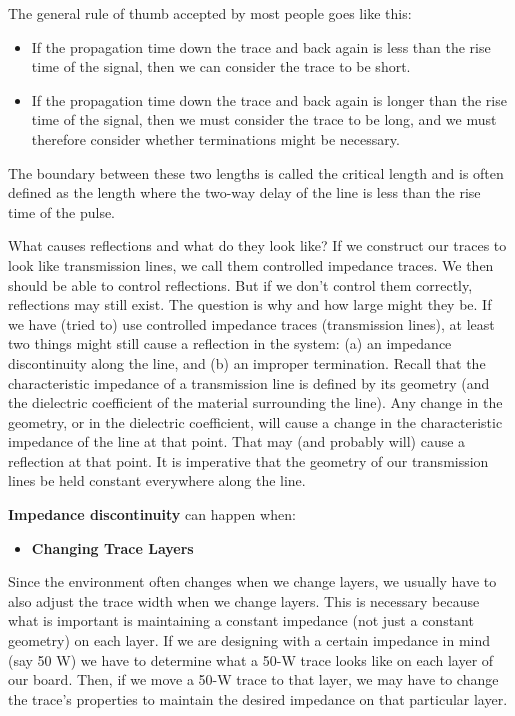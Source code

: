 \documentclass[final]{cubedoc}
\begin{document}
	The general rule of thumb accepted by most people goes like this:
	
	\begin{itemize}
		\item If the propagation time down the trace and back again is less than the rise time of the signal, then we can consider the trace to be short.
		\item If the propagation time down the trace and back again is longer than the rise time of the signal, then we must consider the trace to be long, and we must therefore consider whether terminations might be necessary.
	\end{itemize}
	
	The boundary between these two lengths is called the critical length and is often defined as the length where the two-way delay of the line is less than the rise time of the pulse.
	
	What causes reflections and what do they look like? If we construct our traces to look like transmission lines, we call them controlled impedance traces. We then should be able to control reflections. But if we don't control them correctly, reflections may still exist. The question is why and how large might they be. If we have (tried to) use controlled impedance traces (transmission lines), at least two things might still cause a reflection in the system: (a) an impedance discontinuity along the line, and (b) an improper termination. Recall that the characteristic impedance of a transmission line is defined by its geometry (and the dielectric coefficient of the material surrounding the line). Any change in the geometry, or in the dielectric coefficient, will cause a change in the characteristic impedance of the line at that point. That may (and probably will) cause a reflection at that point. It is imperative that the geometry of our transmission lines be held constant everywhere along the line.
	
	
	\textbf{Impedance discontinuity} can happen when:
	
	\begin{itemize}
		\item \textbf{Changing Trace Layers}
	\end{itemize}{}
	
	
	Since the environment often changes when we change layers, we usually have to also adjust the trace width when we change layers. This is necessary because what is important is maintaining a constant impedance (not just a constant geometry) on each layer. If we are designing with a certain impedance in mind (say 50 W) we have to determine what a 50-W trace looks like on each layer of our board. Then, if we move a 50-W trace to that layer, we may have to change the trace's properties to maintain the desired impedance on that particular layer.
	
\end{document}
